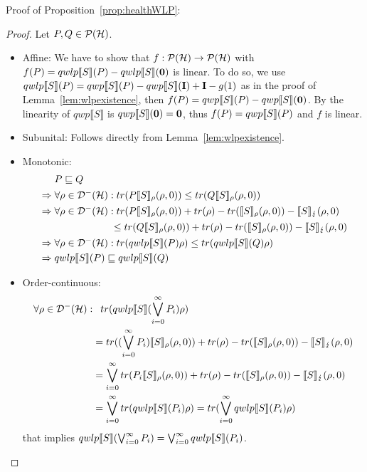 \documentclass[a4paper,UKenglish,cleveref, autoref, thm-restate]{lipics-v2021}
\begin{document}
Proof of Proposition~\ref{prop:healthWLP}:
\begin{proof}
    Let $P,Q \in \mathcal{P}(\mathcal{H})$.
    \begin{itemize}
        \item Affine:
        We have to show that $f:\mathcal{P}(\mathcal{H}) \to \mathcal{P}(\mathcal{H})$ with $f(P)=qwlp\llbracket S \rrbracket (P) - qwlp\llbracket S \rrbracket (\mathbf{0})$ is linear. To do so, we use $qwlp\llbracket S \rrbracket (P) = qwp\llbracket S \rrbracket (P) - qwp\llbracket S \rrbracket (\textbf{I}) + \textbf{I} - g(1)$ as in the proof of Lemma~\ref{lem:wlpexistence}, then $f(P) = qwp\llbracket S \rrbracket (P)-qwp\llbracket S \rrbracket (\mathbf{0})$. By the linearity of $qwp\llbracket S \rrbracket$ is $qwp\llbracket S \rrbracket (\mathbf{0}) = \mathbf{0}$, thus $f(P) = qwp\llbracket S \rrbracket (P)$ and $f$ is linear.
\item Subunital: Follows directly from Lemma~\ref{lem:wlpexistence}.
        \item Monotonic:
        \begin{align*}
            & \phantom{\Rightarrow.}P\sqsubseteq Q \\
            &\Rightarrow \forall \rho \in \density: tr(P \semanticsRho{S}(\rho,0)) \leq tr(Q \semanticsRho{S}(\rho,0))\\
            &\Rightarrow \forall \rho \in \density: tr(P \semanticsRho{S}(\rho,0)) + tr(\rho) - tr(\semanticsRho{S}(\rho,0)) - \semanticsErr{S}(\rho,0)\\
            &\phantom{\Rightarrow \forall \rho \in \density:}\leq tr(Q \semanticsRho{S}(\rho,0)) + tr(\rho) - tr(\semanticsRho{S}(\rho,0)) - \semanticsErr{S}(\rho,0)\\
            &\Rightarrow  \forall \rho \in \density: tr(\qwlp{S}{P} \rho) \leq tr(\qwlp{S}{Q}\rho)\\
            &\Rightarrow  \qwlp{S}{P} \sqsubseteq \qwlp{S}{Q}
        \end{align*}
        \item Order-continuous:
        \begin{align*}
            \forall \rho \in \mathcal{D}^- (\mathcal{H}): & \phantom{=}tr(qwlp\llbracket S \rrbracket (\bigvee_{i=0}^\infty P_i) \rho)\\
            &= tr((\bigvee_{i=0}^\infty P_i) \llbracket S \rrbracket_{\rho}(\rho,0)) + tr(\rho) - tr(\llbracket S \rrbracket_{\rho}(\rho,0)) - \llbracket S \rrbracket_{\lightning}(\rho,0)\\
            &= \bigvee_{i=0}^\infty tr(P_i \llbracket S \rrbracket_{\rho}(\rho,0)) + tr(\rho) - tr(\llbracket S \rrbracket_{\rho}(\rho,0)) - \llbracket S \rrbracket_{\lightning}(\rho,0)\\
            &= \bigvee_{i=0}^\infty tr(qwlp\llbracket S \rrbracket (P_i)\rho)=  tr(\bigvee_{i=0}^\infty qwlp\llbracket S \rrbracket (P_i)\rho)
        \end{align*}
        that implies $qwlp\llbracket S \rrbracket (\bigvee_{i=0}^\infty P_i) = \bigvee_{i=0}^\infty qwlp\llbracket S \rrbracket (P_i)$.
    \end{itemize}
\end{proof}
\end{document}

